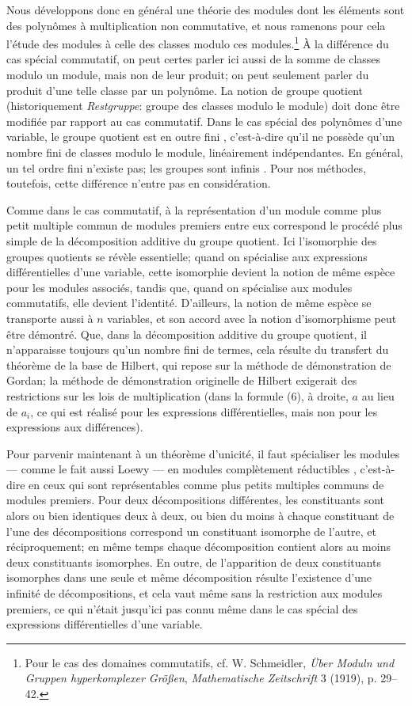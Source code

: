 Nous développons donc en général une théorie des modules dont les éléments sont des polynômes à multiplication non commutative, et nous ramenons pour cela l'étude des modules à celle des classes modulo ces modules.\footnote{Pour le cas des domaines commutatifs, cf. W. Schmeidler, \emph{Über Moduln und Gruppen hyperkomplexer Größen}, \emph{Mathematische Zeitschrift} 3 (1919), p. 29--42.} À la différence du cas spécial commutatif, on peut certes parler ici aussi de la somme de classes modulo un module, mais non de leur produit; on peut seulement parler du produit d'une telle classe par un polynôme. La notion de \og{} groupe quotient \fg{} (historiquement \emph{Restgruppe}: groupe des classes modulo le module) doit donc être modifiée par rapport au cas commutatif. Dans le cas spécial des polynômes d'une variable, le groupe quotient est en outre \og{} fini \fg{}, c'est-à-dire qu'il ne possède qu'un nombre fini de classes modulo le module, linéairement indépendantes. En général, un tel \og{} ordre \fg{} fini n'existe pas; les groupes sont \og{} infinis \fg{}. Pour nos méthodes, toutefois, cette différence n'entre pas en considération.

Comme dans le cas commutatif, à la représentation d'un module comme plus petit multiple commun de modules premiers entre eux correspond le procédé plus simple de la décomposition additive du groupe quotient. Ici l'isomorphie des groupes quotients se révèle essentielle; quand on spécialise aux expressions différentielles d'une variable, cette isomorphie devient la notion de même espèce pour les modules associés, tandis que, quand on spécialise aux modules commutatifs, elle devient l'identité. D'ailleurs, la notion de même espèce se transporte aussi à $n$ variables, et son accord avec la notion d'isomorphisme peut être démontré. Que, dans la décomposition additive du groupe quotient, il n'apparaisse toujours qu'un nombre fini de termes, cela résulte du transfert du théorème de la base de Hilbert, qui repose sur la méthode de démonstration de Gordan; la méthode de démonstration originelle de Hilbert exigerait des restrictions sur les lois de multiplication (dans la formule (6), à droite, $a$ au lieu de $a_i$, ce qui est réalisé pour les expressions différentielles, mais non pour les expressions aux différences).

Pour parvenir maintenant à un théorème d'unicité, il faut spécialiser les modules --- comme le fait aussi Loewy --- en modules \og{} complètement réductibles \fg{}, c'est-à-dire en ceux qui sont représentables comme plus petits multiples communs de modules premiers. Pour deux décompositions différentes, les constituants sont alors ou bien identiques deux à deux, ou bien du moins à chaque constituant de l'une des décompositions correspond un constituant isomorphe de l'autre, et réciproquement; en même temps chaque décomposition contient alors au moins deux constituants isomorphes. En outre, de l'apparition de deux constituants isomorphes dans une seule et même décomposition résulte l'existence d'une infinité de décompositions, et cela vaut même sans la restriction aux modules premiers, ce qui n'était jusqu'ici pas connu même dans le cas spécial des expressions différentielles d'une variable.

